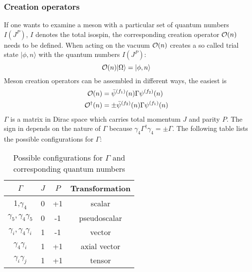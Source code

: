     \subsubsection{Creation operators}
        If one wants to examine a meson with a particular set of quantum numbers $I(J^P)$, $I$ denotes the total isospin, the corresponding creation operator $\mathcal{O}(n)$ needs to be defined. When acting on the vacuum $\mathcal{O}(n)$ creates a so called trial state $|\phi,n\rangle$ with the quantum numbers $I(J^P)$:
        \begin{equation}
            \mathcal{O}(n)|\Omega\rangle = |\phi,n\rangle
        \end{equation}
        Meson creation operators can be assembled in different ways, the easiest is
        \begin{equation}\label{meson_creation_operator}
            \begin{aligned}
                \mathcal{O}(n) &= \bar{\psi}^{(f_1)}(n)\Gamma\psi^{(f_2)}(n)\\
                \mathcal{O}^\dagger(n) &= \pm\bar{\psi}^{(f_2)}(n)\Gamma\psi^{(f_1)}(n)
            \end{aligned}
        \end{equation}
        $\Gamma$ is a matrix in Dirac space which carries total momentum $J$ and parity $P$. The sign in  depends on the nature of $\Gamma$ because $\gamma_4\Gamma^\dagger\gamma_4 = \pm \Gamma$. The following table lists the possible configurations for $\Gamma$:
        \begin{table}[h]
            \centering
            \begin{tabular}{|c|c|c|c|}
            \hline
            \multicolumn{1}{|c|}{$\Gamma$} & \multicolumn{1}{c|}{$J$} & \multicolumn{1}{c|}{$P$} & \multicolumn{1}{c|}{Transformation} \\ \hline
             1,$\gamma_4$ & 0 & +1 &    scalar           \\
             $\gamma_5, \gamma_4\gamma_5$ & 0 & -1 & pseudoscalar\\
             $\gamma_i,\gamma_4\gamma_i$ & 1 & -1 &  vector \\
             $\gamma_4\gamma_i$ & 1 & +1 & axial vector\\
              $\gamma_i\gamma_j$ & 1 & +1 & tensor \\
              \hline
            \end{tabular}
            \caption{Possible configurations for $\Gamma$ and corresponding quantum numbers}
            \label{my-label}
        \end{table}
